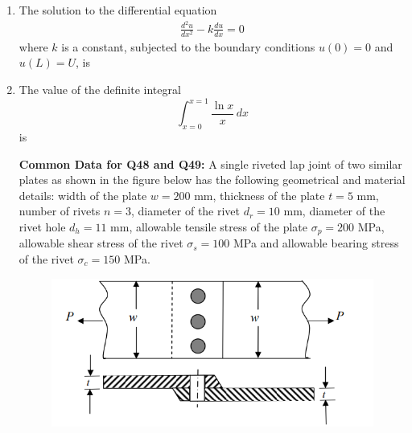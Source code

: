 \documentclass[journal]{IEEEtran}
\begin{document}
\begin{enumerate}[leftmargin=0pt]
\item The solution to the differential equation
\begin{align*}
\frac{d^2u}{dx^2} - k\frac{du}{dx} = 0
\end{align*}
where $k$ is a constant, subjected to the boundary conditions $u(0) = 0$ and $u(L) = U$, is
\begin{enumerate}
\end{enumerate}
\hfill{}

\item The value of the definite integral 
\[
\int_{x=0}^{x=1} \frac{\ln x}{x} \,dx
\]
is
\begin{enumerate}
\end{enumerate}
\hfill{}


\textbf{Common Data for Q48 and Q49:}  
A single riveted lap joint of two similar plates as shown in the figure below has the following geometrical and material details:
width of the plate $w = 200$ mm, thickness of the plate $t=5$ mm, number of rivets $n = 3$, diameter of the rivet $d_r = 10$ mm, diameter of the rivet hole $d_h = 11$ mm, allowable tensile stress of the plate $\sigma_p = 200$ MPa, allowable shear stress of the rivet $\sigma_s = 100$ MPa and allowable bearing stress of the rivet $\sigma_c = 150$ MPa.  
\begin{figure}[h]
\centering
\includegraphics[width=0.45\columnwidth]{Figs/image (21).png}
\caption*{}
\label{fig:48}
\end{figure}


\end{enumerate}
\end{document}
